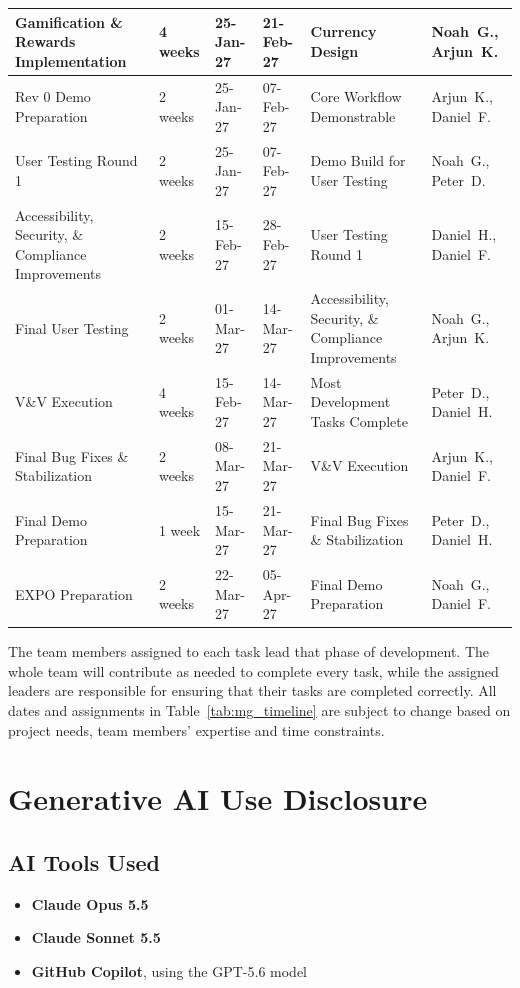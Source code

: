 \documentclass[12pt, titlepage]{article}
\begin{document}
{\begin{longtable}{|>{\raggedright\arraybackslash}p{3.4cm}|p{1.8cm}|p{1.8cm}|p{1.8cm}%
  |>{\raggedright\arraybackslash}p{3.3cm}|>{\raggedright\arraybackslash}p{2.6cm}|}
Gamification \& Rewards Implementation & 4 weeks & 25-Jan-27 & 21-Feb-27 & Currency Design & Noah~G., Arjun~K. \\ \hline
Rev 0 Demo Preparation & 2 weeks & 25-Jan-27 & 07-Feb-27 & Core Workflow Demonstrable & Arjun~K., Daniel~F. \\ \hline
User Testing Round 1 & 2 weeks & 25-Jan-27 & 07-Feb-27 & Demo Build for User Testing & Noah~G., Peter~D. \\ \hline
Accessibility, Security, \& Compliance Improvements & 2 weeks & 15-Feb-27 & 28-Feb-27 & User Testing Round 1 & Daniel~H., Daniel~F. \\ \hline
Final User Testing & 2 weeks & 01-Mar-27 & 14-Mar-27 & Accessibility, Security, \& Compliance Improvements & Noah~G., Arjun~K. \\ \hline
V\&V Execution & 4 weeks & 15-Feb-27 & 14-Mar-27 & Most Development Tasks Complete & Peter~D., Daniel~H. \\ \hline
Final Bug Fixes \& Stabilization & 2 weeks & 08-Mar-27 & 21-Mar-27 & V\&V Execution & Arjun~K., Daniel~F. \\ \hline
Final Demo Preparation & 1 week & 15-Mar-27 & 21-Mar-27 & Final Bug Fixes \& Stabilization & Peter~D., Daniel~H. \\ \hline
EXPO Preparation & 2 weeks & 22-Mar-27 & 05-Apr-27 & Final Demo Preparation & Noah~G., Daniel~F. \\ \hline
\end{longtable}
}

The team members assigned to each task lead that phase of development. The whole
team will contribute as needed to complete every task, while the assigned leaders
are responsible for ensuring that their tasks are completed correctly. All dates
and assignments in Table~\ref{tab:mg_timeline} are subject to change based on
project needs, team members' expertise and time constraints.

\section{Generative AI Use Disclosure}

\subsection{AI Tools Used}

\begin{itemize}
    \item \textbf{Claude Opus 5.5}
    \item \textbf{Claude Sonnet 5.5}
    \item \textbf{GitHub Copilot}, using the GPT-5.6 model
\end{itemize}
\end{document}
